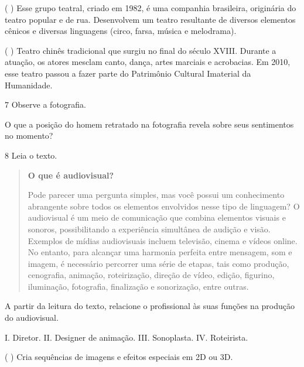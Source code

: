 (  ) Esse grupo teatral, criado em 1982, é uma companhia brasileira,
originária do teatro popular e de rua. Desenvolvem um teatro resultante
de diversos elementos cênicos e diversas linguagens (circo, farsa, música e
melodrama).

(  ) Teatro chinês tradicional que surgiu no final do século XVIII. Durante a
atuação, os atores mesclam canto, dança, artes marciais e acrobacias. Em
2010, esse teatro passou a fazer parte do Patrimônio Cultural Imaterial
da Humanidade.

\num{7} Observe a fotografia.


O que a posição do homem retratado na fotografia revela sobre seus sentimentos no momento?


\num{8} Leia o texto.

\begin{quote}
\textbf{O que é audiovisual?}

Pode parecer uma pergunta simples, mas você possui um conhecimento 
abrangente sobre todos os elementos envolvidos nesse tipo de linguagem? 
O audiovisual é um meio de comunicação que combina elementos visuais e 
sonoros, possibilitando a experiência simultânea de audição e visão. 
Exemplos de mídias audiovisuais incluem televisão, cinema e vídeos online. 
No entanto, para alcançar uma harmonia perfeita entre mensagem, som e 
imagem, é necessário percorrer uma série de etapas, tais como produção, 
cenografia, animação, roteirização, direção de vídeo, edição, figurino, 
iluminação, fotografia, finalização e sonorização, entre outras.

\end{quote}

A partir da leitura do texto, relacione o profissional às suas funções
na produção do audiovisual.

I. Diretor.
II. Designer de animação.
III.  Sonoplasta.
IV. Roteirista.

(  ) Cria sequências de imagens e efeitos especiais em 2D ou 3D.

